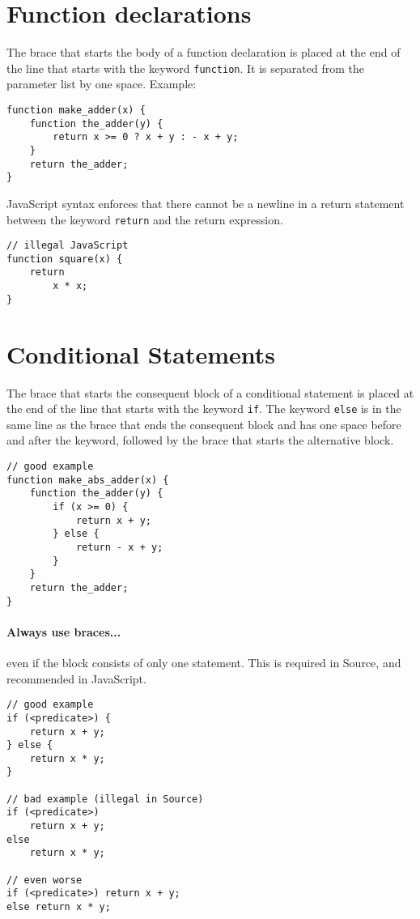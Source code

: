 \section*{Function declarations}

The brace that starts the body of a function declaration is placed at the end of the line that
starts with the keyword \lstinline{function}. It is separated from the parameter list by one
space.
Example:
\begin{lstlisting}
function make_adder(x) {
    function the_adder(y) {
        return x >= 0 ? x + y : - x + y;
    }
    return the_adder;
}
\end{lstlisting}
%
JavaScript syntax enforces that there cannot be a newline in a return statement
between the keyword \lstinline{return} and the return expression.

\begin{lstlisting}
// illegal JavaScript
function square(x) {
    return
        x * x;
}
\end{lstlisting}

\section*{Conditional Statements}

The brace that starts the consequent block of a conditional statement
is placed at the end of the line that starts with the keyword \lstinline{if}.
The keyword \lstinline{else} is in the same line as the brace that ends the
consequent block and has one space before and after the keyword, followed by
the brace that starts the alternative block.
%
\begin{lstlisting}
// good example
function make_abs_adder(x) {
    function the_adder(y) {
        if (x >= 0) {
            return x + y;
        } else {
            return - x + y;
        }
    }
    return the_adder;
}
\end{lstlisting}

\paragraph{Always use braces...} even if the block consists of only 
  one statement. This is required in Source, and recommended in JavaScript.

\begin{lstlisting}
// good example
if (<predicate>) {
    return x + y;
} else {
    return x * y;
}

// bad example (illegal in Source)
if (<predicate>) 
    return x + y;
else 
    return x * y;

// even worse
if (<predicate>) return x + y;
else return x * y;
\end{lstlisting}


